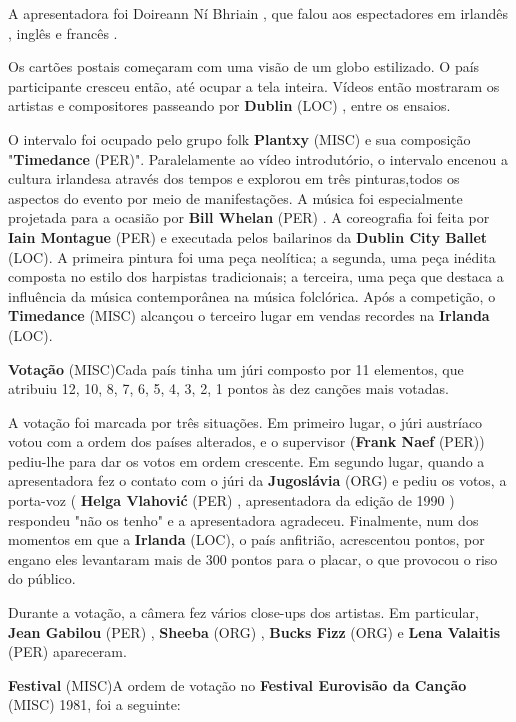 \documentclass[12pt,a4paper]{article}
\begin{document}
A apresentadora foi Doireann Ní Bhriain , que falou aos espectadores em irlandês , inglês e francês .

Os cartões postais começaram com uma visão de um globo estilizado. O país participante cresceu então, até ocupar a tela inteira. Vídeos então mostraram os artistas e compositores passeando por \textbf{Dublin} (LOC) , entre os ensaios.

O intervalo foi ocupado pelo grupo folk \textbf{Plantxy} (MISC) e sua composição "\textbf{Timedance} (PER)". Paralelamente ao vídeo introdutório, o intervalo encenou a cultura irlandesa através dos tempos e explorou em três pinturas,todos os aspectos do evento por meio de manifestações. A música foi especialmente projetada para a ocasião por \textbf{Bill Whelan} (PER) . A coreografia foi feita por \textbf{Iain Montague} (PER) e executada pelos bailarinos da \textbf{Dublin City Ballet} (LOC). A primeira pintura foi uma peça neolítica; a segunda, uma peça inédita composta no estilo dos harpistas tradicionais; a terceira, uma peça que destaca a influência da música contemporânea na música folclórica. Após a competição, o \textbf{Timedance} (MISC) alcançou o terceiro lugar em vendas recordes na \textbf{Irlanda} (LOC).



\textbf{Votação} (MISC)Cada país tinha um júri composto por 11 elementos, que atribuiu 12, 10, 8, 7, 6, 5, 4, 3, 2, 1 pontos às dez canções mais votadas.

A votação foi marcada por três situações. Em primeiro lugar, o júri austríaco votou com a ordem dos países alterados, e o supervisor (\textbf{Frank Naef} (PER)) pediu-lhe para dar os votos em ordem crescente. Em segundo lugar, quando a apresentadora fez o contato com o júri da \textbf{Jugoslávia} (ORG) e pediu os votos, a porta-voz ( \textbf{Helga Vlahović} (PER) , apresentadora da edição de 1990 ) respondeu "não os tenho" e a apresentadora agradeceu. Finalmente, num dos momentos em que a \textbf{Irlanda} (LOC), o país anfitrião, acrescentou pontos, por engano eles levantaram mais de 300 pontos para o placar, o que provocou o riso do público.

Durante a votação, a câmera fez vários close-ups dos artistas. Em particular, \textbf{Jean Gabilou} (PER) , \textbf{Sheeba} (ORG) , \textbf{Bucks Fizz} (ORG) e \textbf{Lena Valaitis} (PER) apareceram.



\textbf{Festival} (MISC)A ordem de votação no \textbf{Festival Eurovisão da Canção} (MISC) 1981, foi a seguinte:
\end{document}
